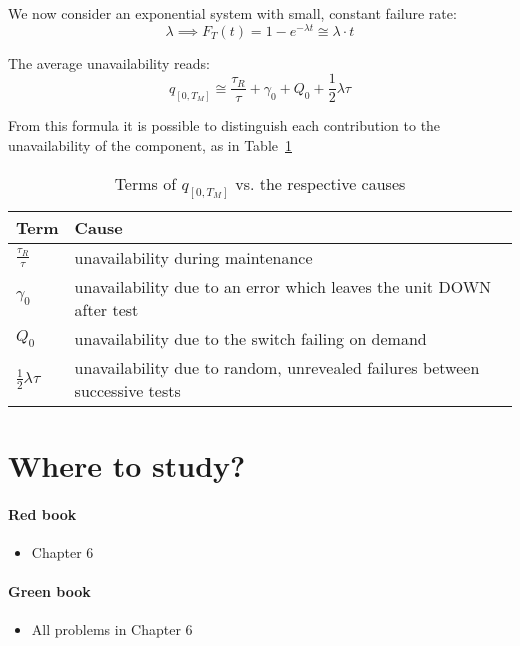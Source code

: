 We now consider an exponential system with small, constant failure rate:
\begin{equation*}
    \lambda \implies F_T(t) = 1 - e^{-\lambda t} \cong \lambda \cdot t
\end{equation*}

The average unavailability reads:
\begin{equation*}
    q_{[0,T_M]} \cong \frac{\tau_R}{\tau} + \gamma_0 + Q_0 + \frac{1}{2}\lambda\tau
\end{equation*}

From this formula it is possible to distinguish each contribution to the
unavailability of the component, as in Table~\ref{tab:periodic_maintenance_components}

\begin{table}[!htp]
    \centering
    \begin{tabular}{ll}
        \toprule
        Term & Cause \\
        \midrule
        
        $\frac{\tau_R}{\tau}$ & unavailability during maintenance \\[2ex]
        $\gamma_0$ & unavailability due to an error which leaves the unit DOWN after test \\[2ex]
        $Q_0$ & unavailability due to the switch failing on demand \\[2ex]
        $\frac{1}{2}\lambda\tau$ & unavailability due to random, unrevealed failures between successive tests \\
        \bottomrule
    \end{tabular}
    \caption{Terms of $q_{[0,T_M]}$ vs. the respective causes}
    \label{tab:periodic_maintenance_components}
\end{table}

\section{Where to study?}
\paragraph*{\color{BrickRed}Red book}
\begin{itemize}
    \item Chapter 6
\end{itemize}

\paragraph*{\color{PineGreen}Green book}
\begin{itemize}
    \item All problems in Chapter 6
\end{itemize}